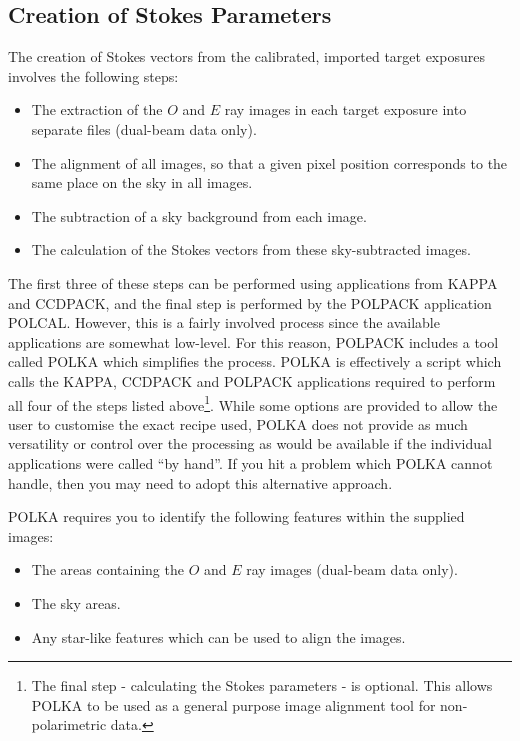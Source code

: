 \documentclass[twoside,11pt]{article}
\newcommand{\htmlref}[2]{#1}
\renewcommand{\_}{\texttt{\symbol{95}}}
\begin{document}
\subsection{Creation of Stokes Parameters}
The creation of Stokes vectors from the calibrated, imported 
target exposures involves the following steps:

\begin{itemize}
\item The extraction of the $O$ and $E$ ray images in each target
exposure into separate files (dual-beam data only).
\item The alignment of all images, so
that a given pixel position corresponds to the same place on the sky in
all images.
\item The subtraction of a sky background from each image.
\item The calculation of the Stokes vectors from these sky-subtracted
images.
\end{itemize}

The first three of these steps can be performed using applications from
KAPPA and CCDPACK, and the final step is performed by the POLPACK
application \htmlref{POLCAL}{POLCAL}. However, this is a fairly involved
process since the available applications are somewhat low-level. For this
reason, POLPACK includes a tool called \htmlref{POLKA}{POLKA} which
simplifies the process. POLKA is effectively a script which calls the
KAPPA, CCDPACK and POLPACK applications required to perform all four of
the steps listed above\footnote{The final step - calculating the Stokes
parameters - is optional. This allows POLKA to be used as a general
purpose image alignment tool for non-polarimetric data.}. While some
options are provided to allow the user to customise the exact recipe
used, POLKA does not provide as much versatility or control over the
processing as would be available if the individual applications were
called ``by hand''. If you hit a problem which POLKA cannot handle, then
you may need to adopt this alternative approach.

POLKA requires you to identify the following features within the supplied
images:

\begin{itemize}
\item The areas containing the $O$ and $E$ ray images (dual-beam data only).
\item The sky areas.
\item Any star-like features which can be used to align the images.
\end{itemize}
\end{document}
